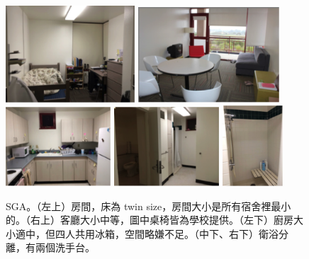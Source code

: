 \documentclass[10pt,a4paper]{book}
\begin{document}
\begin{CJK}{UTF8}{bkai}
\begin{enumerate}
\begin{figure}
\centering
\includegraphics[width=0.43\textwidth]{Pics/sga_1}
\includegraphics[width=0.47\textwidth]{Pics/sga_2}\\
\includegraphics[width=0.35\textwidth]{Pics/sga_3}
\includegraphics[width=0.35\textwidth]{Pics/sga_4}
\includegraphics[width=0.2\textwidth]{Pics/sga_5}
\caption{SGA。（左上）房間，床為 twin size，房間大小是所有宿舍裡最小的。（右上）客廳大小中等，圖中桌椅皆為學校提供。（左下）廚房大小適中，但四人共用冰箱，空間略嫌不足。（中下、右下）衛浴分離，有兩個洗手台。}\label{fig:sga}
\end{figure}


\end{enumerate}
\end{CJK}
\end{document}
